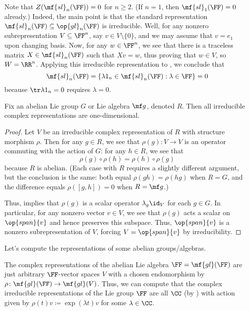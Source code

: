 \documentclass[../notes.tex]{subfiles}
\begin{document}
\begin{example}
	Note that $Z(\mf{sl}_n(\FF))=0$ for $n\ge2$. (If $n=1$, then $\mf{sl}_1(\FF)=0$ already.) Indeed, the main point is that the standard representation $\mf{sl}_n(\FF)\subseteq\op{gl}_n(\FF)$ is irreducible. Well, for any nonzero subrepresentation $V\subseteq\FF^n$, say $v\in V\setminus\{0\}$, and we may assume that $v=e_1$ upon changing basis. Now, for any $w\in\FF^n$, we see that there is a traceless matrix $X\in\mf{sl}_n(\FF)$ such that $Xv=w$, thus proving that $w\in V$, so $W=\RR^n$. Applying this irreducible representation to , we conclude that
	\[\mf{sl}_n(\FF)=\{\lambda1_n\in\mf{sl}_n(\FF):\lambda\in\FF\}=0\]
	because $\tr\lambda1_n=0$ requires $\lambda=0$.
\end{example}
\begin{corollary} \label{cor:abelian-irreps}
	Fix an abelian Lie group $G$ or Lie algebra $\mf g$, denoted $R$. Then all irreducible complex representations are one-dimensional.
\end{corollary}
\begin{proof}
	Let $V$ be an irreducible complex representation of $R$ with structure morphism $\rho$. Then for any $g\in R$, we see that $\rho(g)\colon V\to V$ is an operator commuting with the action of $G$: for any $h\in R$, we see that
	\[\rho(g)\circ\rho(h)=\rho(h)\circ\rho(g)\]
	because $R$ is abelian. (Each case with $R$ requires a slightly different argument, but the conclusion is the same: both equal $\rho(gh)=\rho(hg)$ when $R=G$, and the difference equals $\rho([g,h])=0$ when $R=\mf g$.)
	
	Thus,  implies that $\rho(g)$ is a scalar operator $\lambda_g\id_V$ for each $g\in G$. In particular, for any nonzero vector $v\in V$, we see that $\rho(g)$ acts a scalar on $\op{span}\{v\}$ and hence preserves this subspace. Thus, $\op{span}\{v\}$ is a nonzero subrepresentation of $V$, forcing $V=\op{span}\{v\}$ by irreducibility.
\end{proof}
Let's compute the representations of some abelian groups/algebras.
\begin{example}
	The complex representations of the abelian Lie algebra $\FF=\mf{gl}(\FF)$ are just arbitrary $\FF$-vector spaces $V$ with a chosen endomorphism by $\rho\colon\mf{gl}(\FF)\to\mf{gl}(V)$. Thus, we can compute that the complex irreducible representations of the Lie group $\FF$ are all $\CC$ (by ) with action given by $\rho(t)v\coloneqq\exp(\lambda t)v$ for some $\lambda\in\CC$.
\end{example}
\end{document}
